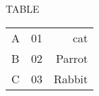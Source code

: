 \documentclass{article}
\begin{document}
  
                \begin{center}  
                       TABLE  
               \end{center}  
                    \begin{tabular}{l c r}  
                      A & 01 & cat\\  
                      B & 02 & Parrot\\  
                      C & 03 & Rabbit   
                \end{tabular}  
         
\end{document}
